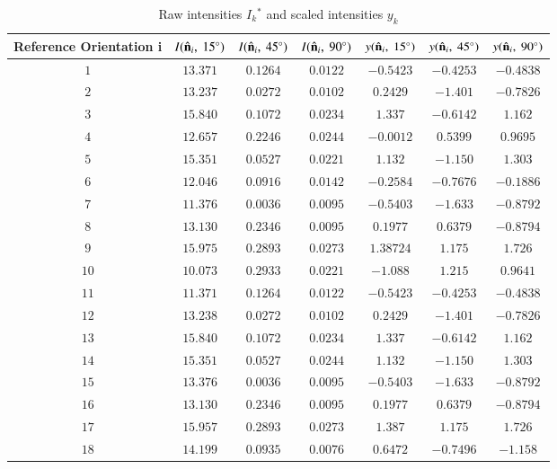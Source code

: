 \documentclass[final, 3p]{elsarticle}
\begin{document}
\newpage
\begin{table}[h]
	\label{tab:A2}
	\begin{center}
		\caption{Raw intensities $I_k$$^*$ and scaled intensities $y_k$}
		\begin{tabular}{|c|c|c|c|c|c|c|}
			\hline\hline
			Reference Orientation i  & $I(\hat{\bf n}_i,\ 15^{\circ})$ &  $I(\hat{\bf n}_i, \ 45^{\circ})$ &  $I(\hat{\bf n}_i,\ 90^{\circ})$ & $y(\hat{\bf n}_i, \ 15^{\circ})$ & $y(\hat{\bf n}_i, \ 45^{\circ})$ & $y(\hat{\bf n}_i, \ 90^{\circ})$ \\
			\hline
			$1$ & $13.371$ & $0.1264$ & $0.0122$ & $-0.5423$ & $-0.4253$ & $-0.4838$ \\
			$2$ & $13.237$ & $0.0272$ & $0.0102$ & $0.2429$ & $-1.401$ & $-0.7826$ \\
			$3$ & $15.840$ & $0.1072$ & $0.0234$ & $1.337$ &$-0.6142$&	$1.162$ \\
			$4$ & $12.657$ & $0.2246$ & $0.0244$ & $-0.0012$ &	$0.5399$ & $0.9695$ \\
			$5$ & $15.351$ & $0.0527$ & $0.0221$ & $1.132$ &	$-1.150$ & $1.303$ \\
			$6$ & $12.046$ & $0.0916$ & $0.0142$ & $-0.2584$ &	$-0.7676$ &	$-0.1886$ \\
			$7$ & $11.376$ & $0.0036$ & $0.0095$ & $-0.5403$ &$-1.633$ & $-0.8792$ \\
			$8$ & $13.130$ & $0.2346$ & $0.0095$ & $0.1977$ & $0.6379$ & $-0.8794$ \\
			$9$ & $15.975$ & $0.2893$ & $0.0273$ & $1.38724$ & $1.175$ & $1.726$ \\
			$10$ & $10.073$ & $0.2933$ & $0.0221$ & $-1.088$	& $1.215$ & $0.9641$ \\
			$11$ & $11.371$ & $0.1264$ & $0.0122$ & $-0.5423$ & $-0.4253$ & $-0.4838$ \\
			$12$ & $13.238$ & $0.0272$ & $0.0102$ & $0.2429$ &	$-1.401$ & $-0.7826$ \\
			$13$ & $15.840$ & $0.1072$ & $0.0234$ & $1.337$ &	$-0.6142$ & $1.162$ \\
			$14$ & $15.351$ & $0.0527$ & $0.0244$ & $1.132$ & $-1.150$ & $1.303$ \\
			$15$ & $13.376$ & $0.0036$ & $0.0095$ & $-0.5403$ & $-1.633$ & $-0.8792$ \\
			$16$ & $13.130$ & $0.2346$ & $0.0095$ & $0.1977$ & $0.6379$ & $-0.8794$ \\
			$17$ & $15.957$ & $0.2893$ & $0.0273$ & $1.387$	& $1.175$	& $1.726$ \\
			$18$ & $14.199$ & $0.0935$ & $0.0076$ & $0.6472$ & $-0.7496$ & $-1.158$ \\

\end{tabular}
\end{center}
\end{table}
\end{document}
